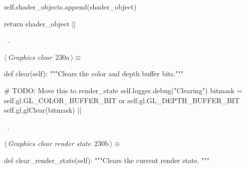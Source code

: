 \documentclass[%
    a4paper,    %
    justified,  %
    nobib,      %
    openany     %
]{tufte-book}
\makeatletter
\renewcommand{\label}[1]{\@tufte@label{##1}}%
\makeatother
\begin{document}
\begin{fullwidth}
\begin{flushleft}
\begin{minipage}{\linewidth}
\begin{pythoncode}
    self.shader_objects.append(shader_object)

    return shader_object
|\NWsep|
\end{pythoncode}
\vspace{1.5ex}
\footnotesize
\begin{list}{}{\setlength{\itemsep}{-\parsep}\setlength{\itemindent}{-\leftmargin}}
\item \NWtxtMacroRefIn\ .

\item{}
\end{list}
\end{minipage}\vspace{4ex}
\end{flushleft}
\begin{flushleft} \small
\begin{minipage}{\linewidth}\label{scrap240}\raggedright\small
{} $\langle\,${\itshape Graphics clear}\nobreak\ {\footnotesize {230a}}$\,\rangle\equiv$
\vspace{-1ex}
\begin{pythoncode}
def clear(self):
    """Clears the color and depth buffer bits."""

    # TODO: Move this to render_state
    self.logger.debug("Clearing")
    bitmask = self.gl.GL_COLOR_BUFFER_BIT or self.gl.GL_DEPTH_BUFFER_BIT
    self.gl.glClear(bitmask)
|\NWsep|
\end{pythoncode}
\vspace{1.5ex}
\footnotesize
\begin{list}{}{\setlength{\itemsep}{-\parsep}\setlength{\itemindent}{-\leftmargin}}
\item \NWtxtMacroRefIn\ .

\item{}
\end{list}
\end{minipage}\vspace{4ex}
\end{flushleft}
\begin{flushleft} \small
\begin{minipage}{\linewidth}\label{scrap241}\raggedright\small
{} $\langle\,${\itshape Graphics clear render state}\nobreak\ {\footnotesize {230b}}$\,\rangle\equiv$
\vspace{-1ex}
\begin{pythoncode}
def clear_render_state(self):
    """Clears the current render state. """


\end{pythoncode}
\end{minipage}
\end{flushleft}
\end{fullwidth}
\end{document}
